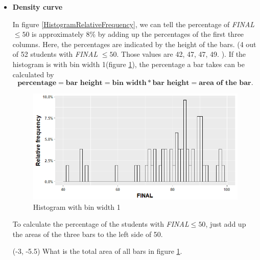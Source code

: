 \documentclass[a4paper, 12pt,twoside]{book}
\begin{document}
\begin{itemize}
\item \textbf{Density curve}\vspace{0.3cm}

In figure \ref{HistogramRelativeFrequency}, we can tell the percentage of \textit{FINAL} $\leq 50$ is approximately $8\%$ by adding up the percentages of the first three columns. Here, the percentages are indicated by the height of the bars. (4 out of 52 students with \textit{FINAL} $\leq 50 $. Those values are 42, 47, 47, 49. ). If the histogram is with bin width 1(figure \ref{HistogramBinWidth1}),  the percentage a bar takes can be calculated by
$$\textbf{percentage} = \textbf{bar height} = \textbf{bin width} * \textbf{bar height} = \textbf{area of the bar}.$$

\begin{figure}[H]
\centering
\includegraphics[scale=0.45]{Histogram3.png}
\caption{Histogram  with bin width 1}
\label{HistogramBinWidth1}
\end{figure}
To calculate the percentage of the students with \textit{FINAL}$\leq 50$, just add up the areas of the three bars to the left side of 50. 

\begin{textblock}{4.8}(-3, -5.5)
What is the total area of all bars in figure \ref{HistogramBinWidth1}.
\end{textblock}


\end{itemize}
\end{document}
